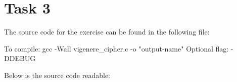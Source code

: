\section{Task 3}


The source code for the exercise can be found in the following file: 

To compile: gcc -Wall vigenere\_cipher.c -o "output-name" Optional flag: -DDEBUG

Below is the source code readable:

